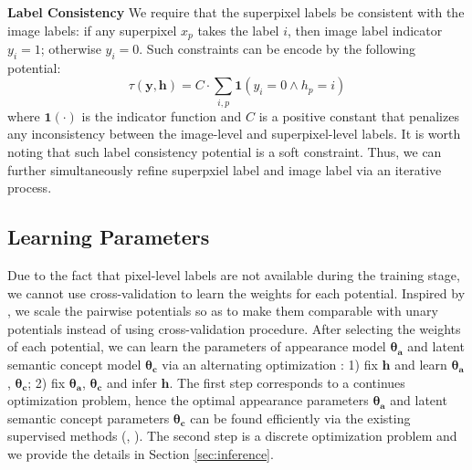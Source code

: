 \textbf{Label Consistency}
We require that the superpixel labels be consistent with the image labels: if any superpixel $x_p$ takes the label $i$, then image label indicator $y_i=1$; otherwise $y_i=0$. Such constraints can be encode by the following potential:
\begin{equation}
    \tau (\boldsymbol{y},\boldsymbol{h}) =
    C \cdot \sum_{i,p} \mathbf{1}(y_i=0 \land h_p=i)
\end{equation}
where $\mathbf{1}(\cdot)$ is the indicator function and $C$ is a positive constant that penalizes any inconsistency between the image-level and superpixel-level labels. It is worth noting that such label consistency potential is a soft constraint. Thus, we can further simultaneously refine superpxiel label and image label via an iterative process.

\subsection{Learning Parameters}
\label{learningparameters}
Due to the fact that pixel-level labels are not available during the training stage, we cannot use cross-validation \cite{kohli2009robust} to learn the weights for each potential.
Inspired by \cite{vezhnevets2011weakly}, we scale the pairwise potentials so as to make them comparable with unary potentials instead of using cross-validation procedure.
After selecting the weights of each potential, we can learn the parameters of appearance model $\boldsymbol{\theta_a}$ and latent semantic concept model $\boldsymbol{\theta_c}$ via an alternating optimization \cite{vezhnevets2011weakly}: 1) fix $\boldsymbol{h}$ and learn $\boldsymbol{\theta_a}$, $\boldsymbol{\theta_c}$; 2) fix $\boldsymbol{\theta_a}$, $\boldsymbol{\theta_c}$ and infer $\boldsymbol{h}$.
The first step corresponds to a continues optimization problem, hence the optimal appearance parameters $\boldsymbol{\theta_a}$ and latent semantic concept parameters $\boldsymbol{\theta_c}$ can be found efficiently via the existing supervised methods (\eg, \cite{shotton2006textonboost}). The second step is a discrete optimization problem and we provide the details in Section \ref{sec:inference}.

